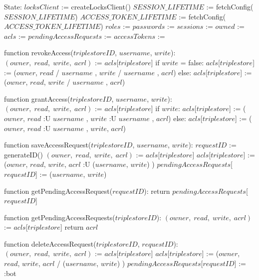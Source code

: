 State:
    $locksClient$ := createLocksClient()
    $SESSION\_LIFETIME$ := fetchConfig($SESSION\_LIFETIME$)
    $ACCESS\_TOKEN\_LIFETIME$ := fetchConfig($ACCESS\_TOKEN\_LIFETIME$)
    $roles$ := {}
    $passwords$ := {}
    $sessions$ := {}
    $owned$ := {}
    $acls$ := {}
    $pendingAccessRequests$ := {}
    $accessTokens$ := {}

function revokeAccess($triplestoreID$, $username$, $write$):
    $(owner, \; read, \; write, \; acrl)$ := $acls$[$triplestore$]
    if $write$ = false: 
        $acls$[$triplestore$] := ($owner$, $read$ / { $username$ }, $write$ / { $username$ }, $acrl$)
    else:
        $acls$[$triplestore$] := ($owner$, $read$, $write$ / { $username$ }, $acrl$)

function grantAccess($triplestoreID$, $username$, $write$):
    $(owner, \; read, \; write, \; acrl)$ := $acls$[$triplestore$]
    if $write$: 
        $acls$[$triplestore$] := ($owner$, $read$ :U { $username$ }, $write$ :U { $username$ }, $acrl$)
    else:
        $acls$[$triplestore$] := ($owner$, $read$ :U { $username$ }, $write$, $acrl$)   

function saveAccessRequest($triplestoreID$, $username$, $write$):
    $requestID$ := generateID()
    $(owner, \; read, \; write, \; acrl)$ := $acls$[$triplestore$]
    $acls$[$triplestore$] := ($owner$, $read$, $write$, $acrl$ :U  { ($username$, $write$) })
    $pendingAccessRequests$[$requestID$] := ($username$, $write$)

function getPendingAccessRequest($requestID$):
    return $pendingAccessRequests$[$requestID$]

function getPendingAccessRequests($triplestoreID$):
    $(owner, \; read, \; write, \; acrl)$ := $acls$[$triplestore$]
    return $acrl$

function deleteAccessRequest($triplestoreID$, $requestID$):
    $(owner, \; read, \; write, \; acrl)$ := $acls$[$triplestore$]
    $acls$[$triplestore$] := ($owner$, $read$, $write$, $acrl$ / { ($username$, $write$) })
    $pendingAccessRequests$[$requestID$] := :bot